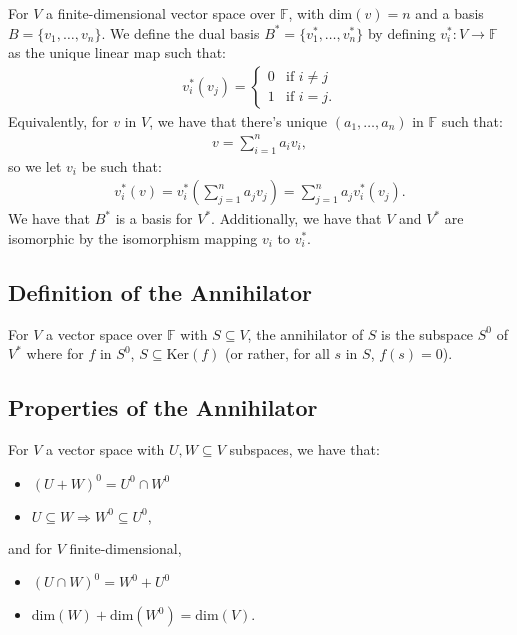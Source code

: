 \documentclass[a4paper, 12pt, twoside]{article}
\begin{document}
For $V$ a finite-dimensional vector space over $\mathbb{F}$, with 
dim$(v) = n$ and a basis $B = \{v_1, \ldots, v_n\}$. 
We define the dual basis $B^* = \{v_1^*, \ldots, v_n^*\}$
by defining $v_i^* : V \to \mathbb{F}$ as the unique linear map
such that: \begin{gather*}
  v_i^*(v_j) = \begin{cases}
    0 & \text{if } i \neq j \\
    1 & \text{if } i = j.
  \end{cases}
\end{gather*} 
\newpage
Equivalently, for $v$ in $V$, we have that there's 
unique $(a_1, \ldots, a_n)$ in $\mathbb{F}$ such that: \begin{gather*}
  v = \sum_{i = 1}^n a_iv_i,
\end{gather*} so we let $v_i$ be such that: \begin{gather*}
  v_i^*(v) = v_i^*\left(\sum_{j = 1}^n a_jv_j\right) 
  = \sum_{j = 1}^n a_jv_i^*(v_j).
\end{gather*} We have that $B^*$ is a basis for $V^*$. Additionally,
we have that $V$ and $V^*$ are isomorphic by the isomorphism mapping
$v_i$ to $v_i^*$.

\subsection{Definition of the Annihilator}

For $V$ a vector space over $\mathbb{F}$ with $S \subseteq V$,
the annihilator of $S$ is the subspace $S^0$ of $V^*$ where
for $f$ in $S^0$, $S \subseteq \text{Ker}(f)$ (or rather, 
for all $s$ in $S$, $f(s) = 0$).

\subsection{Properties of the Annihilator}

For $V$ a vector space with $U, W \subseteq V$
subspaces, we have that: \begin{itemize}
  \item $(U + W)^0 = U^0 \cap W^0$
  \item $U \subseteq W \Rightarrow W^0 \subseteq U^0,$
\end{itemize} and for $V$ finite-dimensional, \begin{itemize}
  \item $(U \cap W)^0 = W^0 + U^0$
  \item $\text{dim}(W) + \text{dim}(W^0) = \text{dim}(V).$
\end{itemize}
\end{document}
